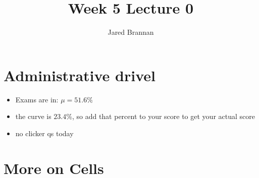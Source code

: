 \documentclass{article}
\title{Week 5 Lecture 0}
\author{Jared Brannan }
\theoremstyle{definition}
\begin{document}
\maketitle

\section{Administrative drivel}
\begin{itemize}
	\item Exams are in: $\mu = 51.6\%$
	\item the curve is $23.4\%$, so add that percent to your score to get your actual score
	\item no clicker qs today
\end{itemize}

\section{More on Cells}
\end{document}
